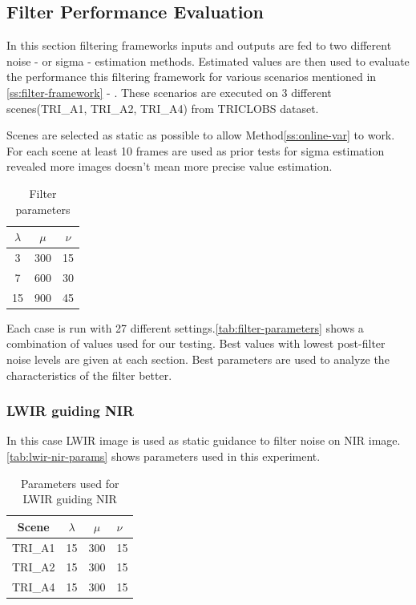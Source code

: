 \documentclass[10pt,twocolumn,letterpaper]{article}
\begin{document}
	\subsection{Filter Performance Evaluation}
	In this section filtering frameworks inputs and outputs are fed to two different noise - or sigma - estimation methods. Estimated values are then used to evaluate the performance this filtering framework for various scenarios mentioned in  \ref{ss:filter-framework} -  . These scenarios are executed on 3 different scenes(TRI\_A1, TRI\_A2, TRI\_A4) from TRICLOBS\cite{triclobs} dataset. 
	
	Scenes are selected as static as possible to allow Method\ref{ss:online-var} to work. For each scene at least 10 frames are used as prior tests for sigma estimation revealed more images doesn't mean more precise value estimation.
	\begin{table}[!h]
		\centering
		\caption{Filter parameters}
		\label{tab:filter-parameters}
		\begin{tabular}{ccc}
			\hline
			\(\lambda\) & \(\mu\) & \(\nu\) \\ \hline
			3           & 300     & 15      \\
			7           & 600     & 30      \\
			15          & 900     & 45      \\ \hline
		\end{tabular}
	\end{table}
	
	Each case is run with 27 different settings.\autoref{tab:filter-parameters} shows a combination of values used for our testing. Best values with lowest post-filter noise levels are given at each section.
	Best parameters are used to analyze the characteristics of the filter better.
	\subsubsection{LWIR guiding NIR}
	In this case LWIR image is used as static guidance to filter noise on NIR image. \autoref{tab:lwir-nir-params} shows parameters used in this experiment.
	\begin{table}[!ht]
		\centering
		\caption{Parameters used for LWIR guiding NIR}
		\label{tab:lwir-nir-params}
		\begin{tabular}{@{}cccl@{}}
			\toprule
			\bfseries Scene & \(\lambda\) & \(\mu\) & \(\nu\) \\ \midrule
			TRI\_A1               & 15        	& 300	  & 15       \\
			TRI\_A2               & 15       	& 300	  & 15       \\
			TRI\_A4               & 15        	& 300	  & 15       \\ \bottomrule
		\end{tabular}
	\end{table}
\end{document}
